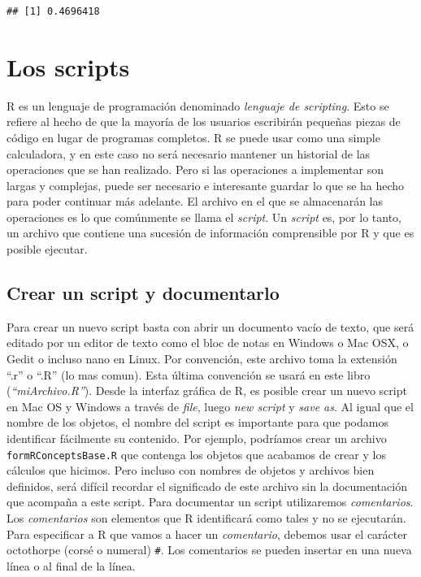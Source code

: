 \documentclass[]{book}
\begin{document}
\begin{verbatim}
## [1] 0.4696418
\end{verbatim}

\section{Los scripts}\label{los-scripts}

R es un lenguaje de programación denominado \emph{lenguaje de
scripting}. Esto se refiere al hecho de que la mayoría de los usuarios
escribirán pequeñas piezas de código en lugar de programas completos. R
se puede usar como una simple calculadora, y en este caso no será
necesario mantener un historial de las operaciones que se han realizado.
Pero si las operaciones a implementar son largas y complejas, puede ser
necesario e interesante guardar lo que se ha hecho para poder continuar
más adelante. El archivo en el que se almacenarán las operaciones es lo
que comúnmente se llama el \emph{script}. Un \emph{script} es, por lo
tanto, un archivo que contiene una sucesión de información comprensible
por R y que es posible ejecutar.

\subsection{Crear un script y
documentarlo}\label{crear-un-script-y-documentarlo}

Para crear un nuevo script basta con abrir un documento vacío de texto,
que será editado por un editor de texto como el bloc de notas en Windows
o Mac OSX, o Gedit o incluso nano en Linux. Por convención, este archivo
toma la extensión ``.r'' o ``.R'' (lo mas comun). Esta última convención
se usará en este libro (\emph{``miArchivo.R''}). Desde la interfaz
gráfica de R, es posible crear un nuevo script en Mac OS y Windows a
través de \emph{file}, luego \emph{new script} y \emph{save as}. Al
igual que el nombre de los objetos, el nombre del script es importante
para que podamos identificar fácilmente su contenido. Por ejemplo,
podríamos crear un archivo \texttt{formRConceptsBase.R} que contenga los
objetos que acabamos de crear y los cálculos que hicimos. Pero incluso
con nombres de objetos y archivos bien definidos, será difícil recordar
el significado de este archivo sin la documentación que acompaña a este
script. Para documentar un script utilizaremos \emph{comentarios}. Los
\emph{comentarios} son elementos que R identificará como tales y no se
ejecutarán. Para especificar a R que vamos a hacer un \emph{comentario},
debemos usar el carácter octothorpe (corsé o numeral) \texttt{\#}. Los
comentarios se pueden insertar en una nueva línea o al final de la
línea.
\end{document}
